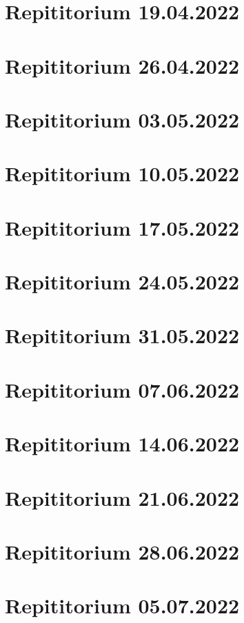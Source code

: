 \documentclass[a4paper,12pt]{article}
\begin{document}
\tableofcontents
\newpage
\section{Repititorium 19.04.2022}

\newpage
\section{Repititorium 26.04.2022}

\newpage
\section{Repititorium 03.05.2022}

\newpage
\section{Repititorium 10.05.2022}

\newpage
\section{Repititorium 17.05.2022}

\newpage
\section{Repititorium 24.05.2022}

\newpage
\section{Repititorium 31.05.2022}

\newpage
\section{Repititorium 07.06.2022}

\newpage
\section{Repititorium 14.06.2022}

\newpage
\section{Repititorium 21.06.2022}

\newpage
\section{Repititorium 28.06.2022}

\newpage
\section{Repititorium 05.07.2022}

\end{document}
